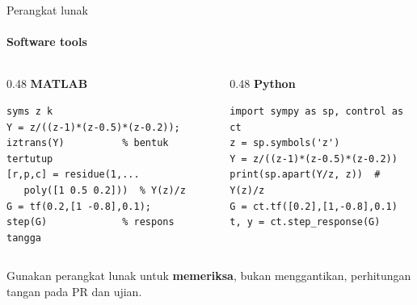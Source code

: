 \documentclass[aspectratio=169,10pt]{beamer}
\begin{document}
\begin{frame}[fragile]{Perangkat lunak}
	\framesubtitle{Software tools}
	\begin{columns}[T]
		\begin{column}{0.48\textwidth}
			\textbf{MATLAB}
			\begin{block}{}
				\scriptsize
\begin{verbatim}
syms z k
Y = z/((z-1)*(z-0.5)*(z-0.2));
iztrans(Y)          % bentuk tertutup
[r,p,c] = residue(1,...
   poly([1 0.5 0.2]))  % Y(z)/z
G = tf(0.2,[1 -0.8],0.1);
step(G)             % respons tangga
\end{verbatim}
			\end{block}
		\end{column}
		\begin{column}{0.48\textwidth}
			\textbf{Python}
			\begin{block}{}
				\scriptsize
\begin{verbatim}
import sympy as sp, control as ct
z = sp.symbols('z')
Y = z/((z-1)*(z-0.5)*(z-0.2))
print(sp.apart(Y/z, z))  # Y(z)/z
G = ct.tf([0.2],[1,-0.8],0.1)
t, y = ct.step_response(G)
\end{verbatim}
			\end{block}
		\end{column}
	\end{columns}
	\vspace{0.2cm}
	{\small Gunakan perangkat lunak untuk \textbf{memeriksa}, bukan menggantikan, perhitungan tangan pada PR dan ujian.}
\end{frame}
\end{document}

